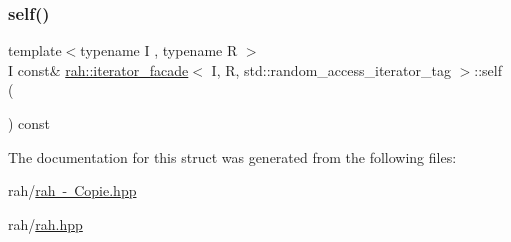 \mbox{\label{structrah_1_1iterator__facade_3_01_i_00_01_r_00_01std_1_1random__access__iterator__tag_01_4_a166a2cf8556d9ceab0f13c25a8479d68}} 
\subsubsection{\texorpdfstring{self()}{self()}\hspace{0.1cm}{\footnotesize\ttfamily [4/4]}}
{\footnotesize\ttfamily template$<$typename I , typename R $>$ \\
I const\& \mbox{\hyperlink{structrah_1_1iterator__facade}{rah\+::iterator\+\_\+facade}}$<$ I, R, std\+::random\+\_\+access\+\_\+iterator\+\_\+tag $>$\+::self (\begin{DoxyParamCaption}{ }\end{DoxyParamCaption}) const\hspace{0.3cm}{\ttfamily [inline]}}



The documentation for this struct was generated from the following files\+:\begin{DoxyCompactItemize}
\item 
rah/\mbox{\hyperlink{rah_01-_01_copie_8hpp}{rah -\/ Copie.\+hpp}}\item 
rah/\mbox{\hyperlink{rah_8hpp}{rah.\+hpp}}\end{DoxyCompactItemize}
